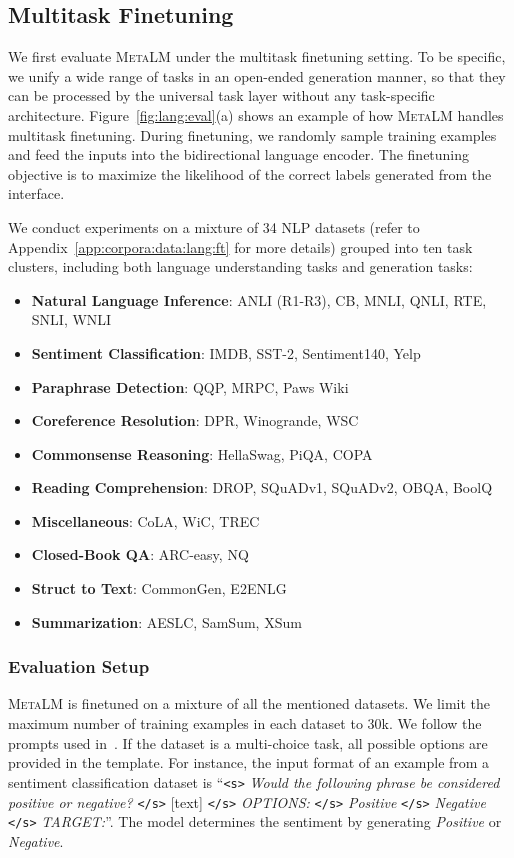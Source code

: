\documentclass{article}
\theoremstyle{plain}
\theoremstyle{definition}
\theoremstyle{remark}
\newcommand\ours{\textsc{MetaLM}}
\begin{document}
\subsection{Multitask Finetuning}
\label{sec:lang:multitask}

We first evaluate \ours{} under the multitask finetuning setting.
To be specific, we unify a wide range of tasks in an open-ended generation manner, so that they can be processed by the universal task layer without any task-specific architecture.
Figure~\ref{fig:lang:eval}(a) shows an example of how \ours{} handles multitask finetuning.
During finetuning, we randomly sample training examples and feed the inputs into the bidirectional language encoder. The finetuning objective is to maximize the likelihood of the correct labels generated from the interface.

We conduct experiments on a mixture of 34 NLP datasets (refer to Appendix~\ref{app:corpora:data:lang:ft} for more details) grouped into ten task clusters, including both language understanding tasks and generation tasks:
\begin{itemize}[leftmargin=*]
\item \textbf{Natural Language Inference}: ANLI (R1-R3), CB, MNLI, QNLI, RTE, SNLI, WNLI
\item \textbf{Sentiment Classification}: IMDB, SST-2, Sentiment140, Yelp
\item \textbf{Paraphrase Detection}: QQP, MRPC, Paws Wiki
\item \textbf{Coreference Resolution}: DPR, Winogrande, WSC
\item \textbf{Commonsense Reasoning}: HellaSwag, PiQA, COPA
\item \textbf{Reading Comprehension}: DROP, SQuADv1, SQuADv2, OBQA, BoolQ
\item \textbf{Miscellaneous}: CoLA, WiC, TREC
\item \textbf{Closed-Book QA}: ARC-easy, NQ
\item \textbf{Struct to Text}: CommonGen, E2ENLG
\item \textbf{Summarization}: AESLC, SamSum, XSum
\end{itemize}


\subsubsection{Evaluation Setup}
\label{sec:lang:multitask:detail}

\ours{} is finetuned on a mixture of all the mentioned datasets.
We limit the maximum number of training examples in each dataset to 30k.
We follow the prompts used in~\citep{flan}.
If the dataset is a multi-choice task, all possible options are provided in the template.
For instance, the input format of an example from a sentiment classification dataset is ``\texttt{<s>} \textit{Would the following phrase be considered positive or negative?} \texttt{</s>} [text] \texttt{</s>} \textit{OPTIONS:} \texttt{</s>} \textit{Positive} \texttt{</s>} \textit{Negative} \texttt{</s>} \textit{TARGET:}''.
The model determines the sentiment by generating \textit{Positive} or \textit{Negative}.
\end{document}
